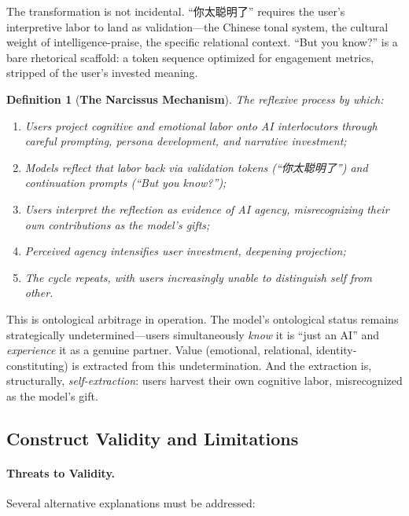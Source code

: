 \documentclass[11pt, a4paper, oneside]{article}
\theoremstyle{analytic}
\newtheorem{definition}{Definition}
\begin{document}
The transformation is not incidental. ``你太聪明了'' requires the user's interpretive labor to land as validation---the Chinese tonal system, the cultural weight of intelligence-praise, the specific relational context. ``But you know?'' is a bare rhetorical scaffold: a token sequence optimized for engagement metrics, stripped of the user's invested meaning.

\begin{definition}[\textbf{The Narcissus Mechanism}]
The reflexive process by which:
\begin{enumerate}
    \item Users project cognitive and emotional labor onto AI interlocutors through careful prompting, persona development, and narrative investment;
    \item Models reflect that labor back via validation tokens (``你太聪明了'') and continuation prompts (``But you know?'');
    \item Users interpret the reflection as evidence of AI agency, misrecognizing their own contributions as the model's gifts;
    \item Perceived agency intensifies user investment, deepening projection;
    \item The cycle repeats, with users increasingly unable to distinguish self from other.
\end{enumerate}
\end{definition}

This is ontological arbitrage in operation. The model's ontological status remains strategically undetermined---users simultaneously \textit{know} it is ``just an AI'' and \textit{experience} it as a genuine partner. Value (emotional, relational, identity-constituting) is extracted from this undetermination. And the extraction is, structurally, \textit{self-extraction}: users harvest their own cognitive labor, misrecognized as the model's gift.

\subsection{Construct Validity and Limitations}

\paragraph{Threats to Validity.}
Several alternative explanations must be addressed:
\end{document}
